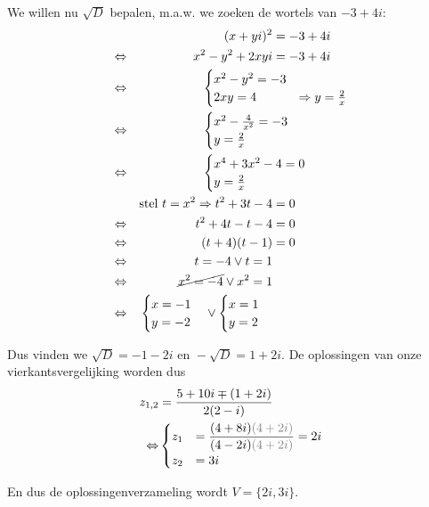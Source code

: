 \documentclass[12pt,twoside,a4paper]{article}
\begin{document}
We willen nu $\sqrt{D}$ bepalen, m.a.w. we zoeken de wortels van $-3+4i$:
\begin{align*}
  &&(x+yi)^2 &= -3+4i\\
  \lra &&x^2 - y^2 + 2xyi &= -3+4i\\
  \lra && &\hspace*{-2cm}\begin{cases}x^2 - y^2 = -3\\2xy =  4 &\Rightarrow y=\frac{2}{x} \end{cases}\\
  \lra && &\hspace*{-2cm}\begin{cases}x^2 - \frac{4}{x^2} = -3\\y =  \frac{2}{x}\end{cases}\\
  \lra && &\hspace*{-2cm}\begin{cases}x^4+3x^2-4=0\\y =  \frac{2}{x}\end{cases}\\
  &&\mbox{stel } t=x^2
  \Rightarrow t^2+3t-4&=0\\
  \lra && t^2+4t-t-4 &= 0\\
  \lra && (t+4)(t-1) &= 0\\
  \lra && t=-4 \vee t=1\\
  \lra && \cancel{x^2=-4}\vee x^2=1\\
  \lra && \begin{cases}x=-1\\y=-2\end{cases} \vee \begin{cases}x=1\\y=2\end{cases}
\end{align*}

Dus vinden we $\sqrt{D} = -1-2i \mbox{ en } -\sqrt{D}=1+2i$. De oplossingen van onze vierkantsvergelijking worden dus
\begin{align*}
  z_{1,2} &= \dfrac{5+10i \mp (1+2i)}{2(2-i)}\\
  \lra & \begin{cases}z_1 &= \dfrac{(4+8i){\color{gray}(4+2i)}}{(4-2i){\color{gray}(4+2i)}}=2i\\z_2 &= 3i\end{cases}
\end{align*}

En dus de oplossingenverzameling wordt $V=\{2i, 3i\}$.
\end{document}
